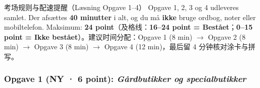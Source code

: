 

\begin{tipbox}{考场规则与配速提醒（Læsning Opgave 1--4）}
Opgave 1, 2, 3 og 4 udleveres samlet. Der afsættes \textbf{40 minutter} i alt, og du må \textbf{ikke} bruge ordbog, noter eller mobiltelefon. Maksimum: \textbf{24 point}（及格线：\textbf{16--24 point = Bestået}；\textbf{0--15 point = Ikke bestået}）。建议时间分配：Opgave 1 (8 min) $\rightarrow$ Opgave 2 (8 min) $\rightarrow$ Opgave 3 (8 min) $\rightarrow$ Opgave 4 (12 min)，最后留 4 分钟核对涂卡与拼写。
\end{tipbox}

\subsubsection*{Opgave 1 (NY · 6 point): \textit{Gårdbutikker og specialbutikker}}

